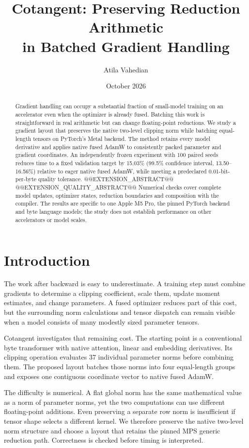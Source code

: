\documentclass[11pt]{article}
\title{Cotangent: Preserving Reduction Arithmetic\\in Batched Gradient Handling}
\author{Atila Vahedian}
\date{October 2026}
\begin{document}
\maketitle
\begin{abstract}
Gradient handling can occupy a substantial fraction of small-model training on
an accelerator even when the optimizer is already fused. Batching this work is
straightforward in real arithmetic but can change floating-point reductions.
We study a gradient layout that preserves the native two-level clipping norm
while batching equal-length tensors on PyTorch's Metal backend. The method
retains every model derivative and applies native fused AdamW to consistently
packed parameter and gradient coordinates. An independently frozen experiment
with 100 paired seeds reduces time to a fixed validation target by 15.03\%
(99.5\% confidence interval, 13.50--16.56\%) relative to eager native fused
AdamW, while meeting a predeclared 0.01-bit-per-byte quality tolerance.
@@EXTENSION_ABSTRACT@@
@@EXTENSION_QUALITY_ABSTRACT@@
Numerical checks cover complete model updates, optimizer states, reduction
boundaries and composition with the compiler. The results are specific to one
Apple M5 Pro, the pinned PyTorch backend and byte language models; the study
does not establish performance on other accelerators or model scales.
\end{abstract}

\section{Introduction}
The work after backward is easy to underestimate. A training step must combine
gradients to determine a clipping coefficient, scale them, update moment
estimates, and change parameters. A fused optimizer reduces part of this cost,
but the surrounding norm calculations and tensor dispatch can remain visible
when a model consists of many modestly sized parameter tensors.

Cotangent investigates that remaining cost. The starting point is a conventional
byte transformer with native attention, linear and embedding derivatives. Its
clipping operation evaluates 37 individual parameter norms before combining
them. The proposed layout batches those norms into four equal-length groups
and exposes one contiguous coordinate vector to native fused AdamW.

The difficulty is numerical. A flat global norm has the same mathematical value
as a norm of parameter norms, yet the two computations can use different
floating-point additions. Even preserving a separate row norm is insufficient
if tensor shape selects a different kernel. We therefore preserve the native
two-level norm structure and choose a layout that retains the pinned MPS generic
reduction path. Correctness is checked before timing is interpreted.
\end{document}
